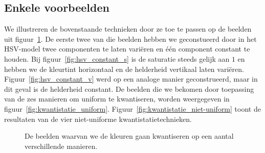 \subsection{Enkele voorbeelden}

We illustreren de bovenstaande technieken door ze toe te passen op de beelden uit 
figuur~\ref{fig:kwantistatie_originelen}. De eerste twee van die beelden hebben we geconstueerd
door in het HSV-model twee componenten te laten vari\"eren en \'e\'en component constant te houden.
Bij figuur~\ref{fig:hsv_constant_s} is de saturatie steeds gelijk aan $1$ en hebben we de kleurtint 
horizontaal en de helderheid vertikaal laten vari\"eren. Figuur~\ref{fig:hsv_constant_v} werd 
op een analoge manier geconstrueerd, maar in dit geval is de helderheid constant.
De beelden die we bekomen door toepassing van de zes manieren om uniform te kwantiseren,
worden weergegeven in figuur~\ref{fig:kwantistatie_uniform}. Figuur~\ref{fig:kwantistatie_niet-uniform}
toont de resultaten van de vier niet-uniforme kwantistatietechnieken.

\begin{figure}[tbp]
\begin{center}
\caption{\label{fig:kwantistatie_originelen}De beelden waarvan we de kleuren gaan kwantiseren op een aantal verschillende manieren.}
\end{center}
\end{figure}

